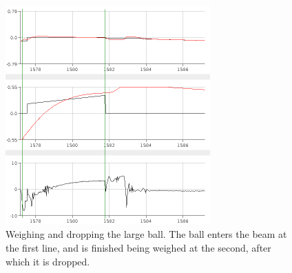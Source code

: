 \begin{figure}[h]
\centering
\includegraphics[width=0.7\textwidth]{figures/weighanddroplargeball-crop.png}
\caption{Weighing and dropping the large ball. The ball enters the beam at the first line, and is finished being weighed at the second, after which it is dropped.}
\label{fig:weighbandthrowlargeball}
\end{figure}



